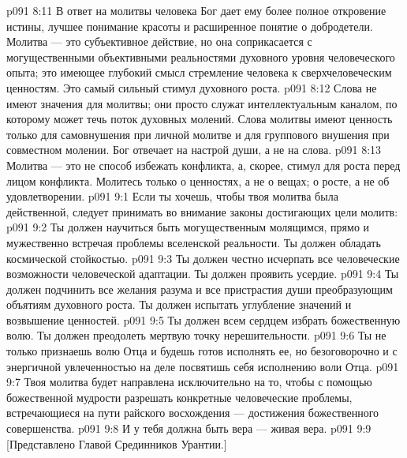 \vs p091 8:11 В ответ на молитвы человека Бог дает ему более полное откровение истины, лучшее понимание красоты и расширенное понятие о добродетели. Молитва --- это субъективное действие, но она соприкасается с могущественными объективными реальностями духовного уровня человеческого опыта; это имеющее глубокий смысл стремление человека к сверхчеловеческим ценностям. Это самый сильный стимул духовного роста.
\vs p091 8:12 Слова не имеют значения для молитвы; они просто служат интеллектуальным каналом, по которому может течь поток духовных молений. Слова молитвы имеют ценность только для самовнушения при личной молитве и для группового внушения при совместном молении. Бог отвечает на настрой души, а не на слова.
\vs p091 8:13 Молитва --- это не способ избежать конфликта, а, скорее, стимул для роста перед лицом конфликта. Молитесь только о ценностях, а не о вещах; о росте, а не об удовлетворении.
\vs p091 9:1 Если ты хочешь, чтобы твоя молитва была действенной, следует принимать во внимание законы достигающих цели молитв:
\vs p091 9:2 \bibnobreakspace Ты должен научиться быть могущественным молящимся, прямо и мужественно встречая проблемы вселенской реальности. Ты должен обладать космической стойкостью.
\vs p091 9:3 \bibnobreakspace Ты должен честно исчерпать все человеческие возможности человеческой адаптации. Ты должен проявить усердие.
\vs p091 9:4 \bibnobreakspace Ты должен подчинить все желания разума и все пристрастия души преобразующим объятиям духовного роста. Ты должен испытать углубление значений и возвышение ценностей.
\vs p091 9:5 \bibnobreakspace Ты должен всем сердцем избрать божественную волю. Ты должен преодолеть мертвую точку нерешительности.
\vs p091 9:6 \bibnobreakspace Ты не только признаешь волю Отца и будешь готов исполнять ее, но безоговорочно и с энергичной увлеченностью на деле посвятишь себя исполнению воли Отца.
\vs p091 9:7 \bibnobreakspace Твоя молитва будет направлена исключительно на то, чтобы с помощью божественной мудрости разрешать конкретные человеческие проблемы, встречающиеся на пути райского восхождения --- достижения божественного совершенства.
\vs p091 9:8 \bibnobreakspace И у тебя должна быть вера --- живая вера.
\vsetoff
\vs p091 9:9 [Представлено Главой Срединников Урантии.]
